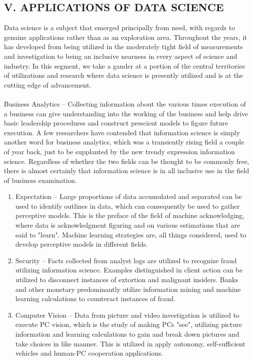 \documentclass[a4paper]{article}
\begin{document}
\begin{multicols}{2}
\subsection*{V. APPLICATIONS OF DATA SCIENCE}
Data science is a subject that emerged principally from need,
with regards to genuine applications rather than as an
exploration area. Throughout the years, it has developed from
being utilized in the moderately tight field of measurements
and investigation to being an inclusive nearness in every aspect
of science and industry. In this segment, we take a gander at a
portion of the central territories of utilizations and research
where data science is presently utilized and is at the cutting
edge of advancement. \\ \\
Business Analytics – Collecting information about the various
times execution of a business can give understanding into the
working of the business and help drive basic leadership
procedures and construct prescient models to figure future
execution. A few researchers have contended that information
science is simply another word for business analytics, which
was a transiently rising field a couple of year back, just to be
supplanted by the new trendy expression information science.
Regardless of whether the two fields can be thought to be
commonly free, there is almost certainly that information
science is in all inclusive use in the field of business
examination.

\begin{enumerate}
\item Expectation – Large proportions of data accumulated and
separated can be used to identify outlines in data, which
can consequently be used to gather perceptive models.
This is the preface of the field of machine acknowledging,
where data is acknowledgment figuring and on various estimations that are said to "learn". Machine learning
strategies are, all things considered, used to develop
perceptive models in different fields.

\item Security – Facts collected from analyst logs are utilized to
recognize fraud utilizing information science. Examples
distinguished in client action can be utilized to disconnect
instances of extortion and malignant insiders. Banks and
other monetary predominantly utilize information mining
and machine learning calculations to counteract instances
of fraud.

\item Computer Vision – Data from picture and video
investigation is utilized to execute PC vision, which is the
study of making PCs "see", utilizing picture information
and learning calculations to gain and break down pictures
and take choices in like manner. This is utilized in apply
autonomy, self-sufficient vehicles and human-PC
cooperation applications.


\end{enumerate}
\end{multicols}
\end{document}
